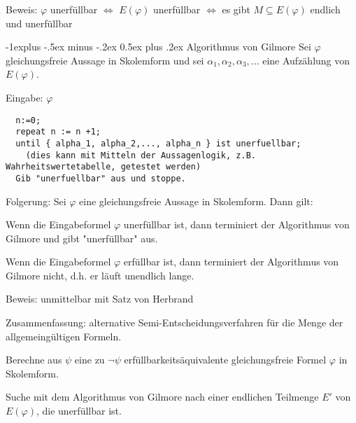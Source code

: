 \documentclass[a4paper]{article}
\makeatletter
\renewcommand{\subsection}{\@startsection{subsection}{2}{0mm}%
                {-1explus -.5ex minus -.2ex}%
                {0.5ex plus .2ex}%
                {\normalfont\normalsize\bfseries}}
\makeatother
\begin{document}
\begin{multicols}{3}
  Beweis: $\varphi$ unerfüllbar $\Leftrightarrow$ $E(\varphi)$ unerfüllbar $\Leftrightarrow$ es gibt $M\subseteq E(\varphi)$ endlich und unerfüllbar


  \subsection{Algorithmus von Gilmore}
  Sei $\varphi$ gleichungsfreie Aussage in Skolemform und sei $\alpha_1,\alpha_2,\alpha_3,...$ eine Aufzählung von $E(\varphi)$.

  Eingabe: $\varphi$
  \begin{lstlisting}
  n:=0;
  repeat n := n +1;
  until { alpha_1, alpha_2,..., alpha_n } ist unerfuellbar;
    (dies kann mit Mitteln der Aussagenlogik, z.B. Wahrheitswertetabelle, getestet werden)
  Gib "unerfuellbar" aus und stoppe.
  \end{lstlisting}

  Folgerung: Sei $\varphi$  eine gleichungsfreie Aussage in Skolemform. Dann gilt:
  \begin{itemize*}
    \item Wenn die Eingabeformel $\varphi$ unerfüllbar ist, dann terminiert der Algorithmus von Gilmore und gibt "unerfüllbar" aus.
    \item Wenn die Eingabeformel $\varphi$ erfüllbar ist, dann terminiert der Algorithmus von Gilmore nicht, d.h. er läuft unendlich lange.
  \end{itemize*}

  Beweis: unmittelbar mit Satz von Herbrand

  Zusammenfassung: alternative Semi-Entscheidungsverfahren für die Menge der allgemeingültigen Formeln.
  \begin{itemize*}
    \item Berechne aus $\psi$ eine zu $\lnot\psi$ erfüllbarkeitsäquivalente gleichungsfreie Formel $\varphi$ in Skolemform.
    \item Suche mit dem Algorithmus von Gilmore nach einer endlichen Teilmenge $E'$ von $E(\varphi)$, die unerfüllbar ist.
  \end{itemize*}



\end{multicols}
\end{document}
